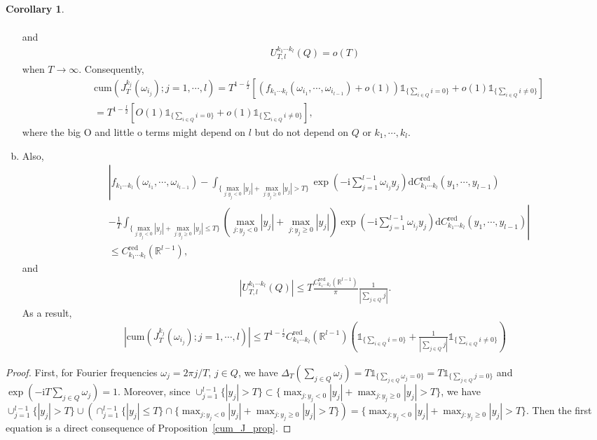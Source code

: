 \documentclass[11pt]{article}
\numberwithin{equation}{section}
\theoremstyle{plain}
\theoremstyle{definition}
\theoremstyle{definition}
\theoremstyle{assumption}
\theoremstyle{proposition}
\theoremstyle{proposition}
\newtheorem{corollary}{Corollary}[section]
\theoremstyle{example}
\theoremstyle{lemma}
\theoremstyle{theorem}
\theoremstyle{remark}
\begin{document}
\begin{corollary}
\begin{enumerate}[(a)]
\begin{align*}
\end{align*}
and
\begin{align*}
U_{T,l}^{k_1\cdots k_l}\left(Q\right) = o(T) 
\end{align*}
when $T\rightarrow\infty$. Consequently,
\begin{align*}
&\mathrm{cum}(J_T^{k_j}(\omega_{i_j});j=1,\cdots,l) 
= T^{1-\frac{l}{2}}\left[\left(f_{k_1\cdots k_l}(\omega_{i_1},\cdots,\omega_{i_{l-1}}) +o(1) 
\right)\mathds{1}_{\{\sum_{i\in Q}i = 0\}} 
+ o(1)\mathds{1}_{\{\sum_{i\in Q}i \neq 0\}} \right] \\
&=T^{1-\frac{l}{2}}\left[O(1) 
\mathds{1}_{\{\sum_{i\in Q}i = 0\}} 
+ o(1)\mathds{1}_{\{\sum_{i\in Q}i \neq 0\}} \right],
\end{align*}
where the big O and little o terms might depend on $l$ but do not depend on $Q$ or $k_1,\cdots,k_l$.
\item Also,
\begin{align*}
&\left|f_{k_1\cdots k_l}(\omega_{i_1},\cdots,\omega_{i_{l-1}}) -\int_{\{\max_{j:y_j<0}|y_j| + \max_{j:y_j\geqslant0}|y_j|> T\}}\exp\left(-\mathrm{i}\sum_{j=1}^{l-1}\omega_{i_j} y_j\right) \mathrm{d}C_{k_1\cdots k_l}^{\mathrm{red}}(y_1, \cdots, y_{l-1})\right. \\
& \left. -\frac{1}{T}\int_{\{\max_{j:y_j<0}|y_j| + \max_{j:y_j\geqslant0}|y_j|\leqslant T\}}\left(\max_{j:y_j<0}|y_j| + \max_{j:y_j\geqslant0}|y_j|\right)\exp\left(-\mathrm{i}\sum_{j=1}^{l-1}\omega_{i_j} y_j\right) \mathrm{d}C_{k_1\cdots k_l}^{\mathrm{red}}(y_1, \cdots, y_{l-1}) \right| \\
&\leqslant C_{k_1\cdots k_l}^{\mathrm{red}}\left(\mathbb{R}^{l-1}\right)  , 
\end{align*}
and
\begin{align*}
|U_{T,l}^{k_1\cdots k_l}\left(Q\right)|
\leqslant T\frac{C_{k_1\cdots k_l}^{\mathrm{red}}\left(\mathbb{R}^{l-1}\right)}{\pi} \frac{1}{|\sum_{j\in Q} j|} .
\end{align*}
As a result,
\begin{align*}
|\mathrm{cum}(J_T^{k_j}(\omega_{i_j});j=1,\cdots,l)|
\leqslant T^{1 - \frac{l}{2}}C_{k_1\cdots k_l}^{\mathrm{red}}\left(\mathbb{R}^{l-1}\right) \left(\mathds{1}_{\{\sum_{i\in Q}i = 0\}} 
+ \frac{1}{|\sum_{j\in Q} j|}\mathds{1}_{\{\sum_{i\in Q}i \neq 0\}} \right)
\end{align*}

\end{enumerate}

\begin{proof}
First, for Fourier frequencies $\omega_j = 2\pi j/T$, $j\in Q$, we have $\Delta_T(\sum_{j\in Q}\omega_j) = T\mathds{1}_{\{\sum_{j\in Q}\omega_j = 0\}} = T\mathds{1}_{\{\sum_{j\in Q}j = 0\}}$ and $\exp(-\mathrm{i}T\sum_{j\in Q}\omega_j) = 1$. Moreover, since $\cup_{j=1}^{l-1}\{|y_j|>T\} \subset \{\max_{j:y_j<0}|y_j| + \max_{j:y_j\geqslant0}|y_j|> T\}$, we have $\cup_{j=1}^{l-1}\{|y_j|>T\} \cup \left(\cap_{j=1}^{l-1}\{|y_j|\leqslant T\}\cap\{\max_{j:y_j<0}|y_j| + \max_{j:y_j\geqslant0}|y_j|> T\}\right)=\{\max_{j:y_j<0}|y_j| + \max_{j:y_j\geqslant0}|y_j|> T\}$. Then the first equation is a direct consequence of Proposition~\ref{cum_J_prop}. 


\end{proof}
\end{corollary}
\end{document}
